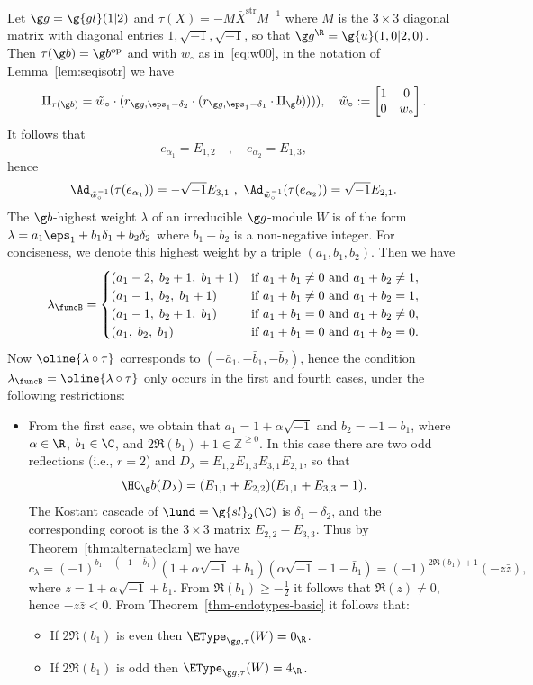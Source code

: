 \documentclass[12pt]{amsart}
\begin{document}
\begin{ex}
Let $\g g=\g{gl}(1|2)$ and $\tau(X)=-M\bar X^\mathrm{str}M^{-1}$ where $M$ is the $3\times 3$ diagonal matrix with diagonal entries $1,\sqrt{-1},\sqrt{-1}$, so that $\g g^\R=\g{u}(1,0|2,0)$. Then $\tau(\g b)=\g b^\mathrm{op}$ and with $w_\circ$ as in~\eqref{eq:w00}, 
in the notation of Lemma~\ref{lem:seqisotr} we have
\[
\Pi_{\tau(\g b)}=\tilde w_\circ \cdot
(r_{\g g,\eps_1-\delta_2}\cdot 
(r_{\g g,\eps_1-\delta_1}\cdot 
\Pi_\g b)))),\quad\tilde w_\circ:=\begin{bmatrix}
1  & 0\\0 & w_\circ\end{bmatrix}.
\]
It follows that 
\[
e_{\alpha_1}=E_{1,2}\quad,\quad
e_{\alpha_2}=E_{1,3},
\]
hence
\[
\Ad_{{\tilde w}_\circ^{-1}}(\tau(e_{\alpha_1}))=-\sqrt{-1}E_{3,1}\ ,\
\Ad_{{\tilde w}_\circ^{-1}}(\tau(e_{\alpha_2}))=\sqrt{-1} E_{2,1}.
\]
The $\g b$-highest weight $\lambda$ of an irreducible $\g g$-module $W$ is of the form $\lambda=a_1\eps_1+b_1\delta_1+b_2\delta_2$ where  $b_1-b_2$ is  a non-negative integer. For conciseness, we denote this highest weight by a triple $(a_1,b_1,b_2)$. 
Then we have  
\[
\lambda_\funcB=
\begin{cases}
(a_1-2,\; b_2+1,\; b_1+1) & \text{if } a_1+b_1\neq 0 \text{ and } a_1+b_2\neq 1,\\
(a_1-1,\; b_2,\; b_1+1) & \text{if } a_1+b_1\neq 0 \text{ and } a_1+b_2=1,\\
(a_1-1,\; b_2+1,\; b_1) & \text{if } a_1+b_1=0 \text{ and } a_1+b_2\neq 0,\\
(a_1,\; b_2,\; b_1) & \text{if } a_1+b_1=0 \text{ and } a_1+b_2=0.
\end{cases}
\]
Now $\oline{\lambda\circ\tau}$ corresponds to $(-\bar a_1,-\bar b_1,-\bar b_2)$, hence the condition $\lambda_\funcB=\oline{\lambda\circ \tau}$ only occurs in the first and fourth cases, under the following restrictions:
\begin{itemize}
\item[(i)] From the first case,  we obtain that $a_1=1+\alpha\sqrt{-1}$ and  $b_2=-1-\bar b_1$, where $\alpha\in\R$, $b_1\in\C$, and $2\Re(b_1)+1\in\mathbb Z^{\geq 0}$. In this case
there are two odd reflections (i.e., $r=2$) and
 $D_\lambda=E_{1,2}E_{1,3}E_{3,1}E_{2,1}$, so that \[
\HC_\g b(D_\lambda)=(E_{1,1}+E_{2,2})(E_{1,1}+E_{3,3}-1).
\]
The Kostant cascade of $\lund=\g{sl}_2(\C)$ is $\delta_1-\delta_2$, and the corresponding coroot is the $3\times 3$ matrix $E_{2,2}-E_{3,3}$. Thus
by Theorem~\ref{thm:alternateclam} we have 
\[
c_\lambda=(-1)^{b_1-(-1-\bar b_1)}(1+\alpha\sqrt{-1}+b_1)(\alpha\sqrt{-1}-1-\bar b_1)=
(-1)^{2\Re(b_1)+1}
(-z\bar z),
\]
where $z=1+\alpha\sqrt{-1}+b_1$. 
From $\Re(b_1)\geq -\frac12$ it follows that $\Re(z)\neq 0$, hence $-z\bar z<0$.
From Theorem~\ref{thm-endotypes-basic} it follows that:
\begin{itemize}
\item If $2\Re(b_1)$ is even then $\EType_{\g g,\tau}(W)=0_\R$.
\item If $2\Re(b_1)$ is odd then $\EType_{\g g,\tau}(W)=4_\R$.
 

\end{itemize}
\end{itemize}
\end{ex}
\end{document}
